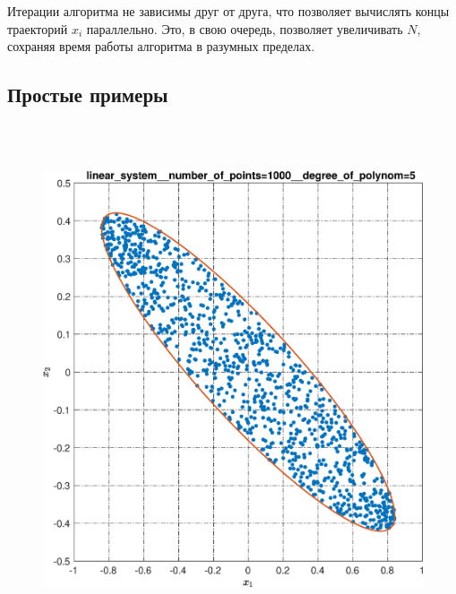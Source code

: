 \documentclass[../main.tex]{subfiles}
\begin{document}
  Итерации алгоритма не зависимы друг от друга, что позволяет вычислять концы траекторий $x_i$ параллельно. 
  Это, в свою очередь, позволяет увеличивать $N$, сохраняя время работы алгоритма в разумных пределах.
  
  \subsection{Простые примеры}
  \begin{figure}[ht!] 
  	\hspace{-2.5ex}
  	\begin{minipage}[b]{.3\linewidth} 
  		\small
  		\centering 
  		\includegraphics[width=\linewidth]{images/linear_system__number_of_points=1000__degree_of_polynom=5.eps}
  	\end{minipage}
  	\hfill
  	\begin{minipage}[b]{.3\linewidth} 
  		\small
  		\centering

\end{minipage}
\end{figure}
\end{document}
